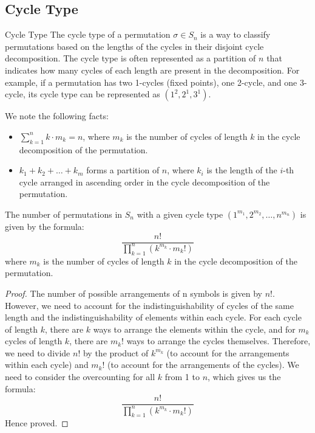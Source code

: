 \documentclass[openany]{book}
\begin{document}
\subsection{Cycle Type}
\begin{mydefinition}{Cycle Type}
    The cycle type of a permutation \( \sigma \in S_n \) is a way to classify permutations based on the lengths of the cycles in their disjoint cycle decomposition. The cycle type is often represented as a partition of \( n \) that indicates how many cycles of each length are present in the decomposition. For example, if a permutation has two 1-cycles (fixed points), one 2-cycle, and one 3-cycle, its cycle type can be represented as \( (1^2, 2^1, 3^1) \).
\end{mydefinition}
We note the following facts:
\begin{itemize}
    \item $\sum_{k=1}^{n} k \cdot m_k = n$, where \( m_k \) is the number of cycles of length \( k \) in the cycle decomposition of the permutation.
    \item $k_1 + k_2 + \ldots + k_m$ forms a partition of \( n \), where \( k_i \) is the length of the \( i \)-th cycle arranged in ascending order in the cycle decomposition of the permutation.
\end{itemize}
\begin{mytheorem}
    The number of permutations in \( S_n \) with a given cycle type \( (1^{m_1}, 2^{m_2}, \ldots, n^{m_n}) \) is given by the formula:
    \[
    \frac{n!}{\prod_{k=1}^{n} (k^{m_k} \cdot m_k!)}
    \]
    where \( m_k \) is the number of cycles of length \( k \) in the cycle decomposition of the permutation.
\end{mytheorem}
\begin{proof}
    The number of possible arrangements of n symbols is given by $n!$. However, we need to account for the indistinguishability of cycles of the same length and the indistinguishability of elements within each cycle. For each cycle of length \( k \), there are \( k \) ways to arrange the elements within the cycle, and for \( m_k \) cycles of length \( k \), there are \( m_k! \) ways to arrange the cycles themselves. Therefore, we need to divide \( n! \) by the product of \( k^{m_k} \) (to account for the arrangements within each cycle) and \( m_k! \) (to account for the arrangements of the cycles). We need to consider the overcounting for all $k$ from 1 to \( n \), which gives us the formula:
    \[
    \frac{n!}{\prod_{k=1}^{n} (k^{m_k} \cdot m_k!)}
    \]
    Hence proved.
\end{proof}
\end{document}
